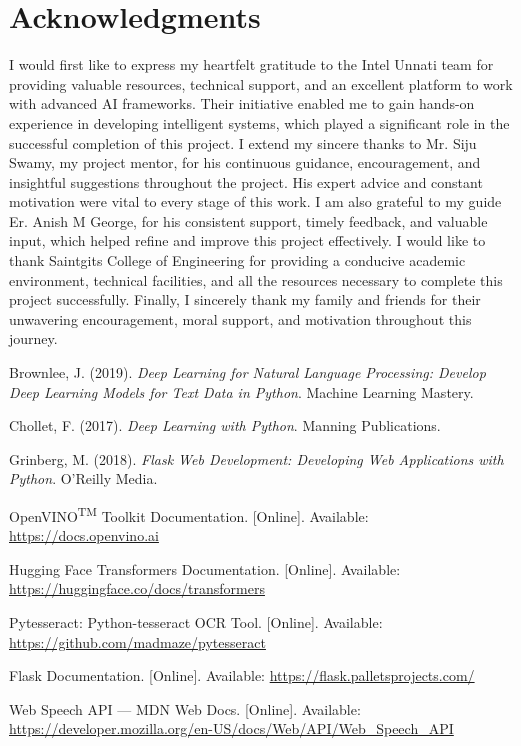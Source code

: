 \documentclass{josis}
\begin{document}
\begin{figure}[h]
\begin{minipage}{0.45\textwidth}
    \label{fig:minipage2}
  \end{minipage}
\end{figure}
\section*{Acknowledgments}
I would first like to express my heartfelt gratitude to the Intel Unnati team for providing valuable resources, technical support, and an excellent platform to work with advanced AI frameworks. Their initiative enabled me to gain hands-on experience in developing intelligent systems, which played a significant role in the successful completion of this project.
I extend my sincere thanks to Mr. Siju Swamy, my project mentor, for his continuous guidance, encouragement, and insightful suggestions throughout the project. His expert advice and constant motivation were vital to every stage of this work.
I am also grateful to my guide  Er. Anish M George, for his consistent support, timely feedback, and valuable input, which helped refine and improve this project effectively.
I would like to thank Saintgits College of Engineering for providing a conducive academic environment, technical facilities, and all the resources necessary to complete this project successfully.
Finally, I sincerely thank my family and friends for their unwavering encouragement, moral support, and motivation throughout this journey.

\begin{thebibliography}{8}

Brownlee, J. (2019). \textit{Deep Learning for Natural Language Processing: Develop Deep Learning Models for Text Data in Python}. Machine Learning Mastery.

Chollet, F. (2017). \textit{Deep Learning with Python}. Manning Publications.

Grinberg, M. (2018). \textit{Flask Web Development: Developing Web Applications with Python}. O'Reilly Media.

OpenVINO\textsuperscript{TM} Toolkit Documentation. [Online]. Available: \url{https://docs.openvino.ai}

Hugging Face Transformers Documentation. [Online]. Available: \url{https://huggingface.co/docs/transformers}

Pytesseract: Python-tesseract OCR Tool. [Online]. Available: \url{https://github.com/madmaze/pytesseract}

Flask Documentation. [Online]. Available: \url{https://flask.palletsprojects.com/}

Web Speech API — MDN Web Docs. [Online]. Available: \url{https://developer.mozilla.org/en-US/docs/Web/API/Web_Speech_API}

\end{thebibliography}
\appendix
\end{document}
